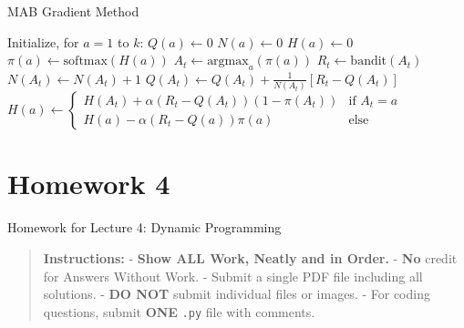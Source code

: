 \documentclass[
  letterpaper,
  DIV=11,
  numbers=noendperiod]{scrreprt}
\makeatletter
\newcommand*\pandocbounded[1]{%
  \sbox\pandoc@box{#1}%
  \Gscale@div\@tempa{\textheight}{\dimexpr\ht\pandoc@box+\dp\pandoc@box\relax}%
  \Gscale@div\@tempb{\linewidth}{\wd\pandoc@box}%
  \ifdim\@tempb\p@<\@tempa\p@\let\@tempa\@tempb\fi%
  \ifdim\@tempa\p@<\p@\scalebox{\@tempa}{\usebox\pandoc@box}%
  \else\usebox{\pandoc@box}%
  \fi%
}
\makeatother
\begin{document}
\begin{algorithm}[htb!]
\caption{MAB Gradient Method}
\begin{algorithmic}[1]
\State Initialize, for $a = 1$ to $k$:
\State $Q(a) \gets 0$
\State $N(a) \gets 0$
\State $H(a) \gets 0$ \\
\State $\pi(a) \gets \text{softmax}(H(a))$
\State $A_t \gets \text{argmax}_a(\pi(a))$
\State $R_t \gets \text{bandit}(A_t)$
\State $N(A_t) \gets N(A_t) + 1$
\State $Q(A_t) \gets Q(A_t) + \frac{1}{N(A_t)}[R_t - Q(A_t)]$
\State $H(a) \gets
    \begin{cases}
        H(A_t) + \alpha (R_t - Q(A_t)) (1 - \pi(A_t)) & \text{if } A_t = a\\
        H(a) - \alpha (R_t - Q(a)) \pi(a) & \text{else}
    \end{cases}$
\Endfor
\end{algorithmic}
\end{algorithm}

\section{\texorpdfstring{\href{https://colab.research.google.com/drive/1B9ko8fJaSFJRbbK493zTUCjI-uBFGla7\#scrollTo=sp5yXpnFeSrp}{\protect\pandocbounded{}}}{}}\label{section-1}

\chapter{Homework 4}\label{homework-4}

\begin{tcolorbox}[enhanced jigsaw, arc=.35mm, toprule=.15mm, leftrule=.75mm, colback=white, left=2mm, colframe=quarto-callout-note-color-frame, rightrule=.15mm, opacityback=0, breakable, bottomrule=.15mm]

Homework for Lecture 4: Dynamic Programming 📝

\end{tcolorbox}

\begin{quote}
\textbf{Instructions:} - \textbf{Show ALL Work, Neatly and in Order.} -
\textbf{No} credit for Answers Without Work. - Submit a single PDF file
including all solutions. - \textbf{DO NOT} submit individual files or
images. - For coding questions, submit \textbf{ONE} \texttt{.py} file
with comments.
\end{quote}
\end{document}
